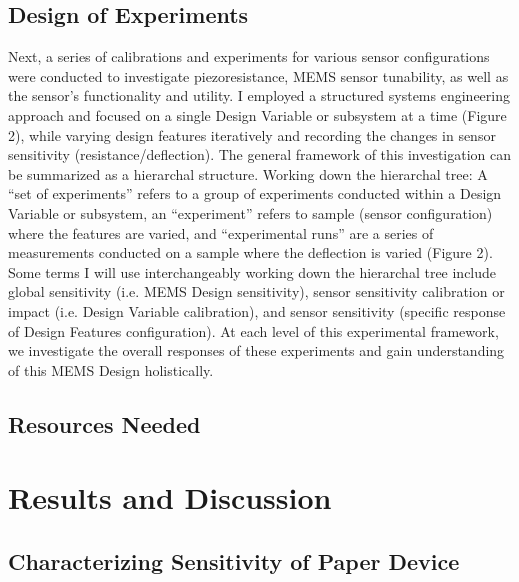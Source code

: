 \documentclass[12pt]{article}
\begin{document}
\subsection{Design of Experiments}
Next, a series of calibrations and experiments for various sensor configurations were conducted to investigate piezoresistance, MEMS sensor tunability, as well as the sensor’s functionality and utility. I employed a structured systems engineering approach and focused on a single Design Variable or subsystem at a time (Figure 2), while varying design features iteratively and recording the changes in sensor sensitivity (resistance/deflection). The general framework of this investigation can be summarized as a hierarchal structure. Working down the hierarchal tree: A “set of experiments” refers to a group of experiments conducted within a Design Variable or subsystem, an “experiment” refers to sample (sensor configuration) where the features are varied, and “experimental runs” are a series of measurements conducted on a sample where the deflection is varied (Figure 2). Some terms I will use interchangeably working down the hierarchal tree include global sensitivity (i.e. MEMS Design sensitivity), sensor sensitivity calibration or impact (i.e. Design Variable calibration), and sensor sensitivity (specific response of Design Features configuration). At each level of this experimental framework, we investigate the overall responses of these experiments and gain understanding of this MEMS Design holistically. 



\subsection{Resources Needed}




\pagebreak


\section{Results and Discussion}
\subsection{Characterizing Sensitivity of Paper Device}
\end{document}

